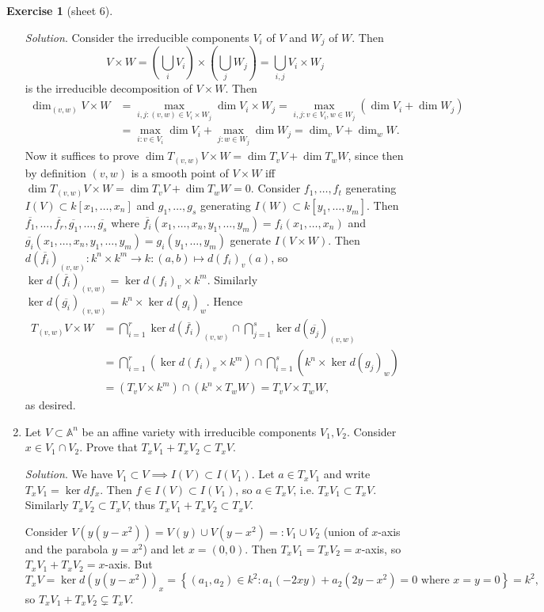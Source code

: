 \documentclass{article}
\newcommand{\A}{\mathbb{A}}
\theoremstyle{definition}
\newtheorem{exe}[defn]{Exercise}
\begin{document}
\begin{exe}[sheet 6]
\begin{enumerate}
\textit{Solution}. Consider the irreducible components $V_i$ of $V$ and $W_j$ of $W$. Then
\[
V\times W=\left(\bigcup_i V_i\right)\times \left(\bigcup_j W_j\right)=\bigcup_{i,j}V_i\times W_j
\]
is the irreducible decomposition of $V\times W$. Then
\[
\begin{aligned}
\dim_{(v,w)}V\times W&=\max_{i,j:(v,w)\in V_i\times W_j}\dim V_i\times W_j=\max_{i,j:v\in V_i,w\in W_j} \left(\dim V_i+\dim W_j\right)\\
&=\max_{i:v\in V_i}\dim V_i+\max_{j:w\in W_j}\dim W_j=\dim_vV+\dim_wW.
\end{aligned}
\]
Now it suffices to prove $\dim T_{(v,w)}V\times W=\dim T_vV+\dim T_wW$, since then by definition $(v,w)$ is a smooth point of $V\times W$ iff $\dim T_{(v,w)}V\times W=\dim T_vV+\dim T_wW=0$. Consider $f_1,\ldots,f_t$ generating $I(V)\subset k[x_1,\ldots,x_n]$ and $g_1,\ldots,g_s$ generating $I(W)\subset k[y_1,\ldots,y_m]$. Then $\overline{f_1},\ldots,\overline{f_r},\overline{g_1},\ldots,\overline{g_s}$ where $\overline{f_i}(x_1,\ldots,x_n,y_1,\ldots,y_m)=f_i(x_1,\ldots,x_n)$ and $\overline{g_i}(x_1,\ldots,x_n,y_1,\ldots,y_m)=g_i(y_1,\ldots,y_m)$ generate $I(V\times W)$. Then $d\left(\overline{f_i}\right)_{(v,w)}:k^n\times k^m\rightarrow k:(a,b)\mapsto d(f_i)_v(a)$, so $\ker d\left(\overline{f_i}\right)_{(v,w)}=\ker d(f_i)_v\times k^m$. Similarly $\ker d\left(\overline{g_i}\right)_{(v,w)}=k^n\times\ker d(g_i)_w$. Hence
\[
\begin{aligned}
T_{(v,w)}V\times W&=\bigcap_{i=1}^r \ker d\left(\overline{f_i}\right)_{(v,w)}\cap \bigcap_{j=1}^s \ker d\left(\overline{g_j}\right)_{(v,w)} \\
&=\bigcap_{i=1}^r \left(\ker d(f_i)_v\times k^m\right)\cap \bigcap_{i=1}^s \left(k^n\times \ker d(g_j)_w\right) \\
&=\left(T_vV\times k^m\right)\cap\left(k^n\times T_wW\right)=T_vV\times T_wW,
\end{aligned}
\]
as desired.

\item Let $V\subset\A^n$ be an affine variety with irreducible components $V_1,V_2$. Consider $x\in V_1\cap V_2$. Prove that $T_xV_1+T_xV_2\subset T_xV$.

\textit{Solution}. We have $V_1\subset V\implies I(V)\subset I(V_1)$. Let $a\in T_xV_1$ and write $T_xV_1=\ker df_x$. Then $f\in I(V)\subset I(V_1)$, so $a\in T_xV$, i.e. $T_xV_1\subset T_xV$. Similarly $T_xV_2\subset T_xV$, thus $T_xV_1+T_xV_2\subset T_xV$.

Consider $V(y(y-x^2))=V(y)\cup V(y-x^2)=:V_1\cup V_2$ (union of $x$-axis and the parabola $y=x^2$) and let $x=(0,0)$. Then $T_xV_1=T_xV_2=x$-axis, so $T_xV_1+T_xV_2=x$-axis. But
\[
T_xV=\ker d(y(y-x^2))_x=\left\{(a_1,a_2)\in k^2:a_1(-2xy)+a_2(2y-x^2)=0\text{ where }x=y=0\right\}=k^2,
\]
so $T_xV_1+T_xV_2\subsetneq T_xV$.


\end{enumerate}
\end{exe}
\end{document}
